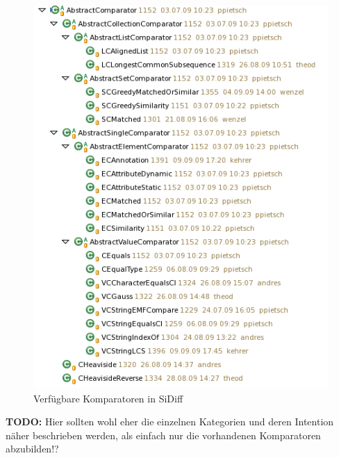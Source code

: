 \documentclass[10pt,a4paper]{scrartcl}
\begin{document}
\begin{figure}[htb]
	\begin{center}
 		\includegraphics[scale=1.0]{pics/available-comparators.png}
	\end{center}
	\caption{Verfügbare Komparatoren in SiDiff}
	\label{available-comparators}
\end{figure} 

\textbf{TODO:} Hier sollten wohl eher die einzelnen Kategorien und deren Intention näher beschrieben
werden, als einfach nur die vorhandenen Komparatoren abzubilden!?
\end{document}
